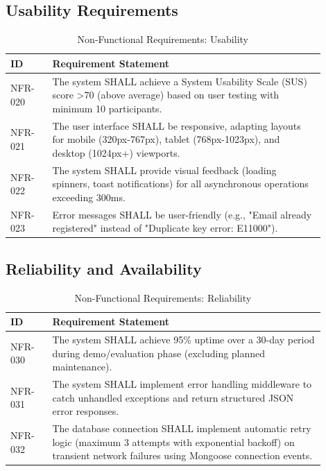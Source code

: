\subsection{Usability Requirements}

\begin{table}[H]
\centering
\caption{Non-Functional Requirements: Usability}
\label{tab:nfr_usability}
\small
\begin{tabular}{@{}p{0.12\linewidth}p{0.78\linewidth}@{}}
\toprule
\textbf{ID} & \textbf{Requirement Statement} \\
\midrule
NFR-020 & The system SHALL achieve a System Usability Scale (SUS) score \textgreater 70 (above average) based on user testing with minimum 10 participants. \\
NFR-021 & The user interface SHALL be responsive, adapting layouts for mobile (320px-767px), tablet (768px-1023px), and desktop (1024px+) viewports. \\
NFR-022 & The system SHALL provide visual feedback (loading spinners, toast notifications) for all asynchronous operations exceeding 300ms. \\
NFR-023 & Error messages SHALL be user-friendly (e.g., "Email already registered" instead of "Duplicate key error: E11000"). \\
\bottomrule
\end{tabular}
\end{table}

\subsection{Reliability and Availability}

\begin{table}[H]
\centering
\caption{Non-Functional Requirements: Reliability}
\label{tab:nfr_reliability}
\small
\begin{tabular}{@{}p{0.12\linewidth}p{0.78\linewidth}@{}}
\toprule
\textbf{ID} & \textbf{Requirement Statement} \\
\midrule
NFR-030 & The system SHALL achieve 95\% uptime over a 30-day period during demo/evaluation phase (excluding planned maintenance). \\
NFR-031 & The system SHALL implement error handling middleware to catch unhandled exceptions and return structured JSON error responses. \\
NFR-032 & The database connection SHALL implement automatic retry logic (maximum 3 attempts with exponential backoff) on transient network failures using Mongoose connection events. \\
\bottomrule
\end{tabular}
\end{table}

